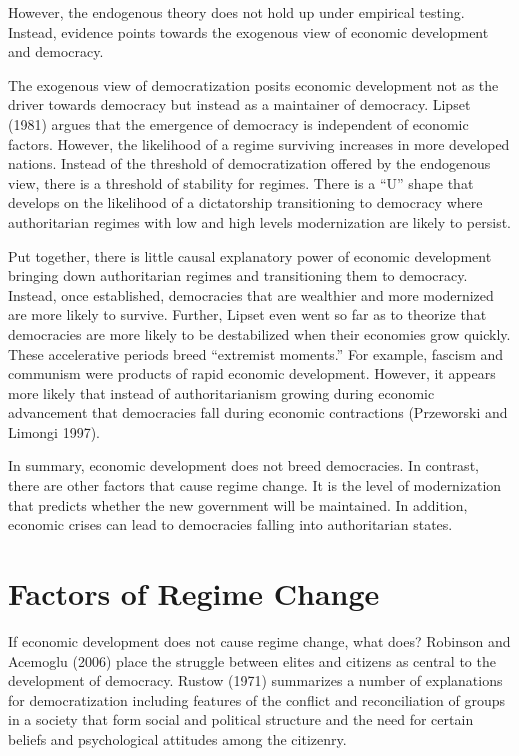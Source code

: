\documentclass[12pt,]{article}
\begin{document}
However, the endogenous theory does not hold up under empirical testing.
Instead, evidence points towards the exogenous view of economic
development and democracy.

The exogenous view of democratization posits economic development not as
the driver towards democracy but instead as a maintainer of democracy.
Lipset (1981) argues that the emergence of democracy is independent of
economic factors. However, the likelihood of a regime surviving
increases in more developed nations. Instead of the threshold of
democratization offered by the endogenous view, there is a threshold of
stability for regimes. There is a ``U'' shape that develops on the
likelihood of a dictatorship transitioning to democracy where
authoritarian regimes with low and high levels modernization are likely
to persist.

Put together, there is little causal explanatory power of economic
development bringing down authoritarian regimes and transitioning them
to democracy. Instead, once established, democracies that are wealthier
and more modernized are more likely to survive. Further, Lipset even
went so far as to theorize that democracies are more likely to be
destabilized when their economies grow quickly. These accelerative
periods breed ``extremist moments.'' For example, fascism and communism
were products of rapid economic development. However, it appears more
likely that instead of authoritarianism growing during economic
advancement that democracies fall during economic contractions
(Przeworski and Limongi 1997).

In summary, economic development does not breed democracies. In
contrast, there are other factors that cause regime change. It is the
level of modernization that predicts whether the new government will be
maintained. In addition, economic crises can lead to democracies falling
into authoritarian states.

\hypertarget{factors-of-regime-change}{%
\section{Factors of Regime Change}\label{factors-of-regime-change}}

If economic development does not cause regime change, what does?
Robinson and Acemoglu (2006) place the struggle between elites and
citizens as central to the development of democracy. Rustow (1971)
summarizes a number of explanations for democratization including
features of the conflict and reconciliation of groups in a society that
form social and political structure and the need for certain beliefs and
psychological attitudes among the citizenry.
\end{document}
